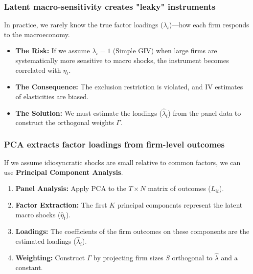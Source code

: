 \documentclass[aspectratio=169,11pt]{beamer}
\begin{document}
\begin{frame}
    \frametitle{Latent macro-sensitivity creates "leaky" instruments}
    
    \vspace{0.5cm}
    {\Large
        In practice, we rarely know the true factor loadings ($\lambda_i$)—how each firm responds to the macroeconomy.
    }
    
    \vspace{0.8cm}
    \begin{itemize}
        \item \textbf{The Risk:} If we assume $\lambda_i = 1$ (Simple GIV) when large firms are systematically more sensitive to macro shocks, the instrument becomes correlated with $\eta_t$.
        \item \textbf{The Consequence:} The exclusion restriction is violated, and IV estimates of elasticities are biased.
        \item \textbf{The Solution:} We must estimate the loadings ($\hat{\lambda}_i$) from the panel data to construct the orthogonal weights $\Gamma$.
    \end{itemize}
\end{frame}

\begin{frame}
    \frametitle{PCA extracts factor loadings from firm-level outcomes}
    
    \vspace{0.5cm}
    {\Large
        If we assume idiosyncratic shocks are small relative to common factors, we can use \textbf{Principal Component Analysis}.
    }
    
    \vspace{0.8cm}
    \begin{enumerate}
        \item \textbf{Panel Analysis:} Apply PCA to the $T \times N$ matrix of outcomes ($L_{it}$).
        \item \textbf{Factor Extraction:} The first $K$ principal components represent the latent macro shocks ($\hat{\eta}_t$).
        \item \textbf{Loadings:} The coefficients of the firm outcomes on these components are the estimated loadings ($\hat{\lambda}_i$).
        \item \textbf{Weighting:} Construct $\Gamma$ by projecting firm sizes $S$ orthogonal to $\hat{\lambda}$ and a constant.
    \end{enumerate}
\end{frame}
\end{document}
